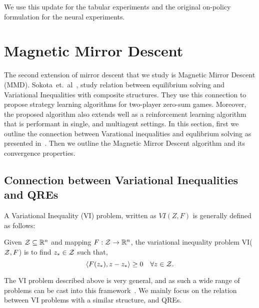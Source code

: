 We use this update for the tabular experiments and the original on-policy
formulation for the neural experiments.

\section[MMD]{Magnetic Mirror Descent}
The second extension of mirror descent that we study is Magnetic Mirror Descent (MMD).
Sokota~et.~al~\cite{sokotaUnified2023}, study relation between equilibrium solving and Variational
Inequalities with composite structures.
They use this connection to propose strategy learning algorithms for two-player zero-sum games.
Moreover, the proposed algorithm also extends well as a reinforcement learning algorithm that is
performant in single, and multiagent settings.
In this section, first we outline the connection between Varational inequalities and equlibrium
solving as presented in~\cite{sokotaUnified2023}.
Then we outline the Magnetic Mirror Descent algorithm and its convergence properties.

\subsection{Connection between Variational Inequalities and QREs}
A Variational Inequality (VI) problem, written as $VI(Z, F)$ is generally defined as follows:
\begin{definition}
	\label{def:vi} Given $\mathcal{Z} \subseteq \mathbb{R}^n$ and mapping $F: \mathcal{Z} \rightarrow
		\mathbb{R}^n$, the variational inequality problem VI($\mathcal{Z}, F$) is to find $z_{\ast} \in \mathcal{Z}$ such that,
	\[ \langle F(z_{\ast}), z - z_{\ast} \rangle \geq 0 \quad \forall z \in \mathcal{Z}.
	\]
\end{definition}

The VI problem described above is very general, and as such a wide range of problems can be cast
into this framework~\cite{facchineiFiniteDimensional2004}.
We mainly focus on the relation between VI problems with a similar structure, and QREs.

